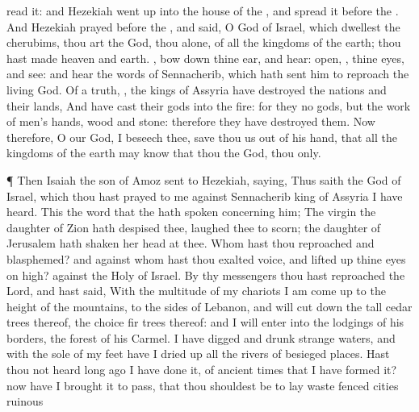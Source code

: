 {read it: and
Hezekiah went
up into the
house of the
{}, and
spread it
before the
{}.
And
Hezekiah
prayed
before the
{}, and
said, O
{}
God of
Israel, which
dwellest
{} the
cherubims, thou art the
God,
{} thou alone, of all the
kingdoms of the
earth; thou hast
made
heaven and
earth.
, bow
down thine
ear, and
hear:
open,
{}, thine
eyes, and
see: and
hear the
words of
Sennacherib, which hath
sent him to
reproach the
living
God.
Of a
truth,
{}, the
kings of
Assyria have
destroyed the
nations and their
lands,
And have
cast their
gods into the
fire: for they
{} no
gods, but the
work of
men’s
hands,
wood and
stone: therefore they have
destroyed them.
Now therefore, O
{} our
God, I beseech thee,
save thou us out of his
hand, that all the
kingdoms of the
earth may
know that thou
{} the
{}
God,
{} thou only.
\par }{\PP {}¶ Then
Isaiah the
son of
Amoz
sent to
Hezekiah,
saying, Thus
saith the
{}
God of
Israel,
{} which thou hast
prayed to me against
Sennacherib
king of
Assyria I have
heard.
This
{} the
word that the
{} hath
spoken concerning him; The
virgin the
daughter of
Zion hath
despised thee,
{} laughed thee to
scorn; the
daughter of
Jerusalem hath
shaken her
head at
thee.
Whom hast thou
reproached and
blasphemed? and against whom hast thou
exalted
{}
voice, and lifted
up thine
eyes on
high?
{} against the
Holy
{} of
Israel.
By thy
messengers thou hast
reproached the
Lord, and hast
said, With the
multitude of my
chariots I am come
up to the
height of the
mountains, to the
sides of
Lebanon, and will cut
down the
tall cedar
trees thereof,
{} the
choice fir
trees thereof: and I will
enter into the
lodgings of his
borders,
{} the
forest of his
Carmel.
I have
digged and
drunk
strange
waters, and with the
sole of my
feet have I
dried up all the
rivers of besieged
places.
Hast thou not
heard long
ago
{} I have
done it,
{} of
ancient
times that I have
formed it? now have I
brought it to pass, that thou shouldest be to lay
waste
fenced
cities
{}
ruinous
}
